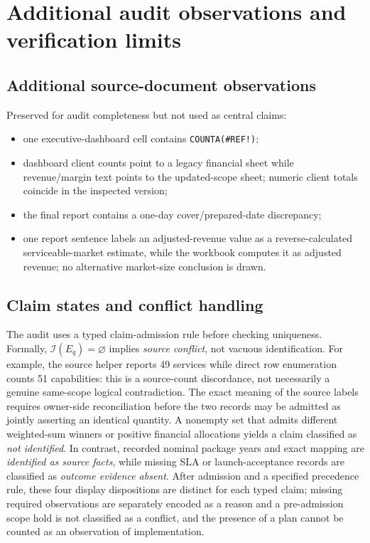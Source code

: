\section{Additional audit observations and verification limits}\label{app:reproducibility}
\setcounter{table}{0}

\subsection{Additional source-document observations}\label{app:minor-observations}
Preserved for audit completeness but not used as central claims:
\begin{itemize}[leftmargin=1.4em]
\item one executive-dashboard cell contains \texttt{COUNTA(\#REF!)};
\item dashboard client counts point to a legacy financial sheet while revenue/margin text points to the updated-scope sheet; numeric client totals coincide in the inspected version;
\item the final report contains a one-day cover/prepared-date discrepancy;
\item one report sentence labels an adjusted-revenue value as a reverse-calculated serviceable-market estimate, while the workbook computes it as adjusted revenue; no alternative market-size conclusion is drawn.
\end{itemize}


\subsection{Claim states and conflict handling}\label{app:claim-states}
The audit uses a typed claim-admission rule before checking uniqueness. Formally, $\mathcal I(E_q)=\varnothing$ implies \emph{source conflict}, not vacuous identification. For example, the source helper reports 49 services while direct row enumeration counts 51 capabilities: this is a source-count discordance, not necessarily a genuine same-scope logical contradiction. The exact meaning of the source labels requires owner-side reconciliation before the two records may be admitted as jointly asserting an identical quantity. A nonempty set that admits different weighted-sum winners or positive financial allocations yields a claim classified as \emph{not identified}. In contrast, recorded nominal package years and exact mapping are \emph{identified as source facts}, while missing SLA or launch-acceptance records are classified as \emph{outcome evidence absent}. After admission and a specified precedence rule, these four display dispositions are distinct for each typed claim; missing required observations are separately encoded as a reason and a pre-admission scope hold is not classified as a conflict, and the presence of a plan cannot be counted as an observation of implementation.

